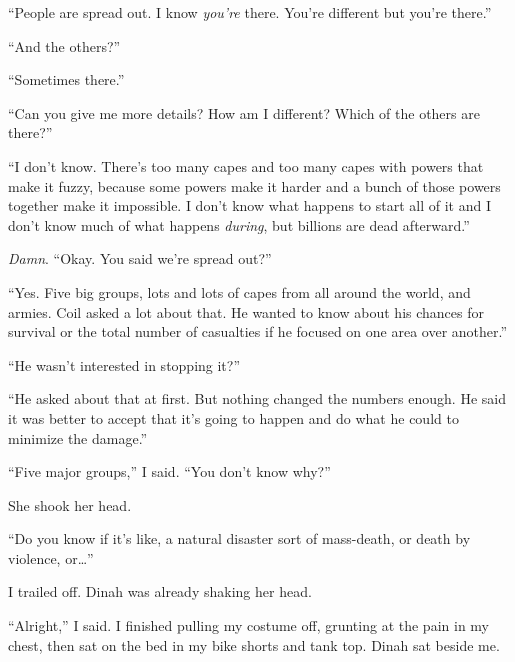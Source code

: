 ``People are spread out.  I know \emph{you're} there.  You're different but you're there.''



``And the others?''



``Sometimes there.''



``Can you give me more details?  How am I different?  Which of the others are there?''



``I don't know.  There's too many capes and too many capes with powers that make it fuzzy, because some powers make it harder and a bunch of those powers together make it impossible.   I don't know what happens to start all of it and I don't know much of what happens \emph{during}, but billions are dead afterward.''



\emph{Damn}.  ``Okay.  You said we're spread out?''



``Yes.  Five big groups, lots and lots of capes from all around the world, and armies.  Coil asked a lot about that.  He wanted to know about his chances for survival or the total number of casualties if he focused on one area over another.''



``He wasn't interested in stopping it?''



``He asked about that at first.  But nothing changed the numbers enough.  He said it was better to accept that it's going to happen and do what he could to minimize the damage.''



``Five major groups,'' I said.  ``You don't know why?''



She shook her head.



``Do you know if it's like, a natural disaster sort of mass-death, or death by violence, or\ldots''



I trailed off.  Dinah was already shaking her head.



``Alright,'' I said.  I finished pulling my costume off, grunting at the pain in my chest, then sat on the bed in my bike shorts and tank top.  Dinah sat beside me.



